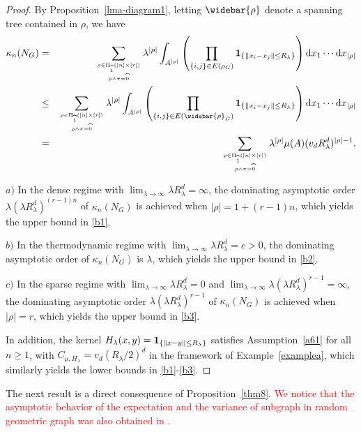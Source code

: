 \documentclass[bj,authoryear,noshowframe]{imsart}
\theoremstyle{plain}
\theoremstyle{remark}
\newcommand{\bone}{{\bf 1}}
\begin{document}
\begin{proof}
 By Proposition~\ref{lma-diagram1},
 letting $\widebar{\rho}$ denote a spanning tree contained in $\rho$,
  we have 
\begin{eqnarray}
  \nonumber
  \kappa_n(N_G)&=&\sum_{\rho \in \Pi_{\widehat{1}} ( [n] \times [r])
    \atop
    {\rho \wedge \pi = \widehat{0}}
  }
  \lambda^{|\rho|}\int_{A^{|\rho |}}
  \left(
\prod_{\{i,j\} \in E(\rho_G)}
\bone_{\{\|x_i-x_j\|\leq R_\lambda\}}
\right)
\mathrm{d}x_1\cdots\mathrm{d}x_{|\rho|}
\\
\nonumber
&\leq &\sum_{\rho \in \Pi_{\widehat{1}} ( [n] \times [r])
    \atop
    {\rho \wedge \pi = \widehat{0}}
  }
  \lambda^{|\rho|}\int_{A^{|\rho |}}
  \left(
\prod_{\{i,j\} \in E(\widebar{\rho}_G)}
\bone_{\{\|x_i-x_j\|\leq R_\lambda\}}
\right)
\mathrm{d}x_1\cdots\mathrm{d}x_{|\rho|}
\\
\nonumber
&=&\sum_{\rho \in \Pi_{\widehat{1}} ( [n] \times [r])
    \atop
    {\rho \wedge \pi = \widehat{0}}
  }
  \lambda^{|\rho|} \mu (A) (v_d R_\lambda^d)^{|\rho|-1}. 
\end{eqnarray}
 
  \noindent
$a)$ 
  In the dense regime
  with $\lim_{\lambda\to \infty} \lambda R_\lambda^d = \infty$,
  the dominating asymptotic order 
  $\lambda(\lambda R_\lambda^d)^{(r-1)n}$ of $\kappa_n(N_G)$ is
  achieved when $|\rho|=1+(r-1)n$,
  which yields the upper bound in \eqref{b1}. 

\noindent
$b)$ 
    In the thermodynamic regime
    with $\lim_{\lambda\to \infty} \lambda R_\lambda^d = c>0$,
    the dominating asymptotic order of $\kappa_n(N_G)$ is $\lambda$,
    which yields the upper bound in \eqref{b2}. 

  \noindent
$c)$ 
    In the sparse regime
    with $\lim_{\lambda\to \infty} \lambda R_\lambda^d = 0$ and
    $\lim_{\lambda\to \infty} \lambda(\lambda R_\lambda^d)^{r-1} = \infty$,
    the dominating asymptotic order $\lambda(\lambda R_\lambda^d)^{r-1}$
    of $\kappa_n(N_G)$ is achieved when $|\rho|=r$, 
    which yields the upper bound in \eqref{b3}. 

    \medskip 

 In addition, the kernel 
 $H_\lambda (x,y)=\bone_{\{\|x-y\|\leq R_\lambda\}}$
 satisfies Assumption~\ref{a61} for all $n\geq 1$,
 with $C_{\mu , H_\lambda} = v_d (R_\lambda /2)^d$
 in the framework of Example~\ref{examplea},
 which similarly yields the lower bounds in 
 \eqref{b1}-\eqref{b3}.
\end{proof}
 The next result is a direct consequence of Proposition~\ref{thm8}. \textcolor{red}{We notice that the asymptotic behavior of the expectation and the variance of subgraph in random geometric graph was also obtained in \cite{bachmann}.}
\end{document}
